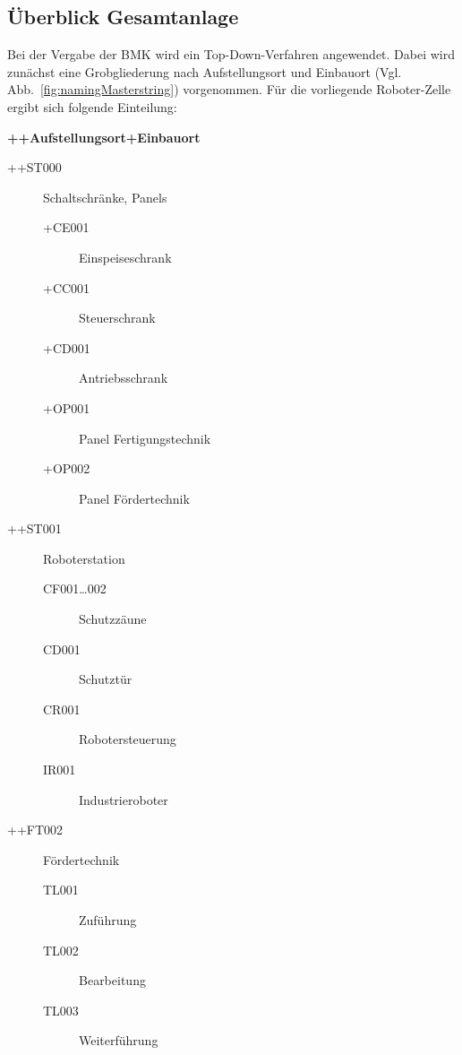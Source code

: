 \subsection*{Überblick Gesamtanlage}
\label{subsec:namingOverview}


Bei der Vergabe der BMK wird ein Top-Down-Verfahren angewendet. Dabei wird zunächst eine Grobgliederung nach Aufstellungsort und Einbauort (Vgl. Abb.~\ref{fig:namingMasterstring}) vorgenommen. Für die vorliegende Roboter-Zelle ergibt sich folgende Einteilung:

\leer\textbf{++Aufstellungsort+Einbauort}
\begin{description}
  \item[++ST000] Schaltschränke, Panels
  \begin{description}
      \item [+CE001] Einspeiseschrank
      \item [+CC001] Steuerschrank
      \item [+CD001] Antriebsschrank
      \item [+OP001] Panel Fertigungstechnik
      \item [+OP002] Panel Fördertechnik
  \end{description}
  \item[++ST001] Roboterstation
  \begin{description}
    \item [CF001\ldots002] Schutzzäune
    \item [CD001] Schutztür
    \item [CR001] Robotersteuerung
    \item [IR001] Industrieroboter
  \end{description}
  \item[++FT002] Fördertechnik
  \begin{description}
    \item [TL001] Zuführung
    \item [TL002] Bearbeitung
    \item [TL003] Weiterführung
  \end{description}
\end{description}


